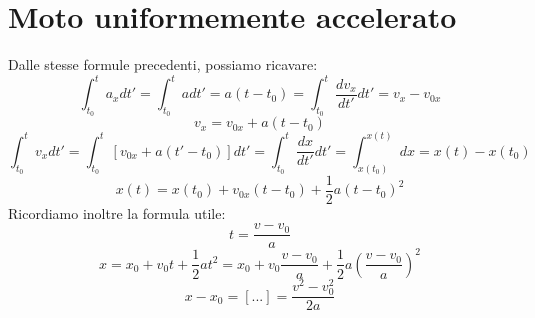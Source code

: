 \documentclass[a4paper,12pt]{article}
\begin{document}
\newpage

\section{Moto uniformemente accelerato}
Dalle stesse formule precedenti, possiamo ricavare:
$$ \int_{t_0}^t a_x dt' = \int_{t_0}^t a dt' = a(t-t_0) = \int_{t_0}^t \frac{dv_x}{dt'}dt' = v_x - v_{0x} $$
$$ v_x = v_{0x} + a(t - t_0) $$
$$ \int_{t_0}^t v_x dt' = \int_{t_0}^t [v_{0x} + a(t'-t_0)]dt' = \int_{t_0}^{t} \frac{dx}{dt'}dt' 
= \int_{x(t_0)}^{x(t)} dx = x(t) - x(t_0) $$
$$ x(t) = x(t_0) + v_{0x}(t-t_0) + \frac{1}{2}a(t-t_0)^2 $$
Ricordiamo inoltre la formula utile:
$$ t = \frac{v - v_0}{a} $$
$$ x = x_0 + v_0t + \frac{1}{2}at^2 = x_0 + v_0\frac{v - v_0}{a} + \frac{1}{2}a(\frac{v - v_0}{a})^2 $$
$$ x - x_0 = [...] = \frac{v^2 - v_0^2}{2a} $$   
\end{document}
